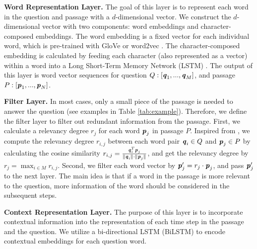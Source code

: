 \documentclass[11pt,letterpaper]{article}
\begin{document}
\textbf{Word Representation Layer.} The goal of this layer is to represent each word in the question and passage with a $d$-dimensional vector. We construct the $d$-dimensional vector with two components: word embeddings and character-composed embeddings. The word embedding is a fixed vector for each individual word, which is pre-trained with GloVe \cite{pennington2014glove} or word2vec \cite{mikolov2013distributed}. The character-composed embedding is calculated by feeding each character (also represented as a vector) within a word into a Long Short-Term Memory Network (LSTM) \cite{hochreiter1997long}. The output of this layer is word vector sequences for question $Q:[\textbf{\emph{q}}_1,...,\textbf{\emph{q}}_M]$, and passage $P: [\textbf{\emph{p}}_1,...,\textbf{\emph{p}}_N]$.

\textbf{Filter Layer.} In most cases, only a small piece of the passage is needed to answer the question (see examples in Table \ref{tab:example}). Therefore, we define the filter layer to filter out redundant information from the passage. First, we calculate a relevancy degree $r_j$ for each word $\textbf{\emph{p}}_j$ in passage $P$. Inspired from , we compute the relevancy degree $r_{i,j}$ between each word pair $\textbf{\emph{q}}_i \in Q$ and $\textbf{\emph{p}}_j \in P$ by calculating the cosine similarity $r_{i,j}=\frac{\textbf{\emph{q}}_i^T\textbf{\emph{p}}_j}{\|\textbf{\emph{q}}_i\|\cdot\|\textbf{\emph{p}}_j\|}$, and get the relevancy degree by $r_j=\max_{i \in M} r_{i,j}$.
Second, we filter each word vector by $\textbf{\emph{p}}^{\prime}_j=r_j \cdot \textbf{\emph{p}}_j$, and pass $\textbf{\emph{p}}^{\prime}_j$ to the next layer. The main idea is that if a word in the passage is more relevant to the question, more information of the word should be considered in the subsequent steps.


\textbf{Context Representation Layer.} The purpose of this layer is to incorporate contextual information into the representation of each time step in the passage and the question. We utilize a bi-directional LSTM (BiLSTM) to encode contextual embeddings for each question word.
\end{document}
